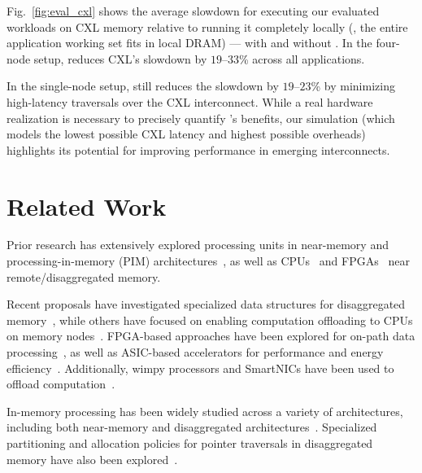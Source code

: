  
Fig.~\ref{fig:eval_cxl} shows the average slowdown for executing our evaluated workloads on CXL memory relative to running it completely locally (\ie, the entire application working set fits in local DRAM) --- with and without \pulse. In the four-node setup, \pulse reduces CXL's slowdown by $19$--$33$\% across all applications. 

In the single-node setup, \pulse still reduces the slowdown by $19$--$23$\% by minimizing high-latency traversals over the CXL interconnect. While a real hardware realization is necessary to precisely quantify \pulse's benefits, our simulation (which models the lowest possible CXL latency and highest possible \pulse overheads) highlights its potential for improving performance in emerging interconnects.


\section{Related Work}
Prior research has extensively explored processing units in near-memory and processing-in-memory (PIM) architectures~\cite{ahn2015scalable, asghari2016chameleon, dai2018graphh, schuiki2018scalable, mutlu2019processing, lockerman2020livia, tu2022redcim, devic2022_PIM, wang2022_Nearstream, xie2023mpu, mutlu2022modern, oliveira2022accelerating, eckert2022eidetic, chi2016prime, seshadri2017simple, kwon2019_TensorDIMM, boroumand2019_codna, cho2020_data, ke2020_RecNMP, wang2021stream, xie2021spacea, ke2021near, singh2021fpga, olgun2022pidram, dai2022dimmining, gu2020ipim, gomez2023evaluating, walkers, impica}, as well as CPUs~\cite{storagefunctions, splinter, aifm, kayak_nsdi_21, storm_systor_19, zhang2022_teleport} and FPGAs~\cite{clio, strom} near remote/disaggregated memory.

Recent proposals have investigated specialized data structures for disaggregated memory~\cite{sherman, clover, fusee, rolex, marlin, sephash, ditto}, while others have focused on enabling computation offloading to CPUs on memory nodes~\cite{aifm, kayak_nsdi_21, splinter, storagefunctions, storm_systor_19}. FPGA-based approaches have been explored for on-path data processing~\cite{clio, strom}, as well as ASIC-based accelerators for performance and energy efficiency~\cite{impica, walkers}. Additionally, wimpy processors and SmartNICs have been used to offload computation~\cite{rmc_hotnets20, redn}.

In-memory processing has been widely studied across a variety of architectures, including both near-memory and disaggregated architectures~\cite{ahn2015scalable, impica, asghari2016chameleon, chi2016prime, seshadri2017simple, dai2018graphh, schuiki2018scalable, mutlu2019processing, kwon2019_TensorDIMM, boroumand2019_codna, gu2020ipim, lockerman2020livia, cho2020_data, ke2020_RecNMP, wang2021stream, xie2021spacea, ke2021near, singh2021fpga, olgun2022pidram, mutlu2022modern, oliveira2022accelerating, eckert2022eidetic, tu2022redcim, dai2022dimmining, devic2022_PIM, wang2022_Nearstream, gomez2023evaluating, xie2023mpu}. Specialized partitioning and allocation policies for pointer traversals in disaggregated memory have also been explored~\cite{sherman, clover, fusee, rolex, marlin, sephash, ditto}.

